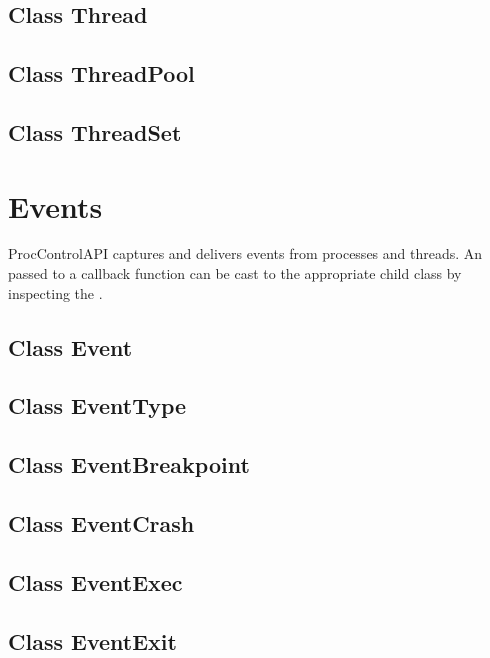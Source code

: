 \documentclass{article}
\begin{document}
  \subsection{Class Thread}
    

  \subsection{Class ThreadPool}
    

  \subsection{Class ThreadSet}
    

\section{Events}
  ProcControlAPI captures and delivers events from processes and threads.
  An  passed to a callback function can be cast to the
  appropriate child class by inspecting the .

  \subsection{Class Event}
    

  \subsection{Class EventType}
    

  \subsection{Class EventBreakpoint}
    

  \subsection{Class EventCrash}
    

  \subsection{Class EventExec}
    

  \subsection{Class EventExit}
    
\end{document}
